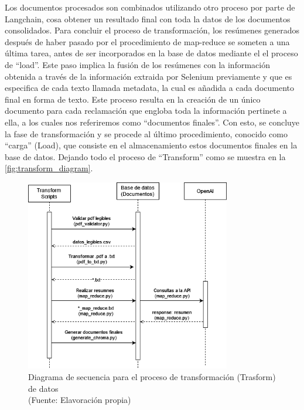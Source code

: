 \newpage

\par Los documentos procesados son combinados utilizando otro proceso por parte de Langchain, cosa obtener un resultado final con toda la datos de los documentos consolidados. 
Para concluir el proceso de transformación, los resúmenes generados después de haber pasado por el procedimiento de map-reduce 
se someten a una última tarea, antes de ser incorporados en la base de datos mediante el el proceso de ``load''. Este paso implica la fusión de los resúmenes con la 
información obtenida a través de la información extraida por Selenium previamente y que es especifica de cada texto llamada metadata, la cual es añadida a cada documento final en forma de texto. Este proceso 
resulta en la creación de un único documento para cada reclamación que engloba toda la información pertinete a ella, a los cuales nos referiremos como ``documentos finales''. 
Con esto, se concluye la fase de transformación y se procede al último procedimiento, conocido como ``carga'' (Load), que consiste 
en el almacenamiento estos documentos finales en la base de datos. Dejando todo el proceso de ``Transform'' como se muestra en la \autoref{fig:transform_diagram}. \\


\begin{figure}[ht!]
    \centering
    \includegraphics[width=0.8\textwidth]{figures/transfrom_diagram.png}
    \caption[Diagrama de secuencia para el proceso de transformación (Trasform) de datos]{Diagrama de secuencia para el proceso de transformación (Trasform) de datos\\
    {\scriptsize (Fuente: Elavoración propia)}}
    \label{fig:transform_diagram}
\end{figure}



